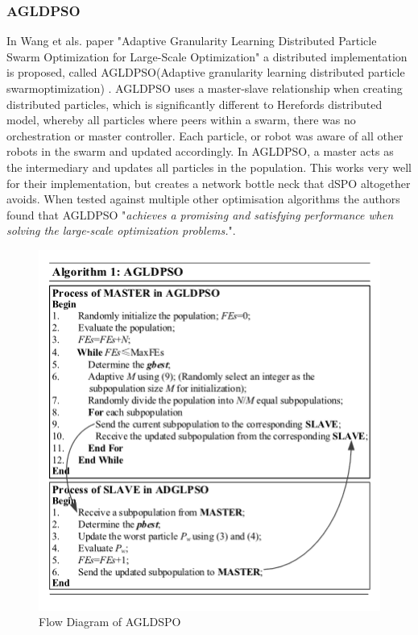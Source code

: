 \documentclass[oneside,12pt]{book}
\begin{document}
\subsubsection{AGLDPSO}
In Wang et als. paper "Adaptive Granularity Learning Distributed Particle Swarm Optimization for Large-Scale Optimization" a distributed implementation is proposed, called AGLDPSO(Adaptive granularity learning distributed particle swarmoptimization) \cite{wang2020adaptive}. AGLDPSO uses a master-slave relationship when creating distributed particles, which is significantly different to Herefords distributed model, whereby all particles where peers within a swarm, there was no orchestration or master controller. Each particle, or robot was aware of all other robots in the swarm and updated accordingly. In AGLDPSO, a master acts as the intermediary and updates all particles in the population. This works very well for their implementation, but creates a network bottle neck that dSPO altogether avoids. When tested against multiple other optimisation algorithms the authors found that AGLDPSO "\textit{achieves a promising and satisfying performance when solving the large-scale optimization problems.}". 
\begin{figure}[H]
    \centering
    \includegraphics[scale=0.8]{Images/AGLDPSO.png}
    \caption{Flow Diagram of AGLDSPO \cite{wang2020adaptive} }
    \label{fig:Flow Diagram of AGLDSPO}
\end{figure}
\end{document}
